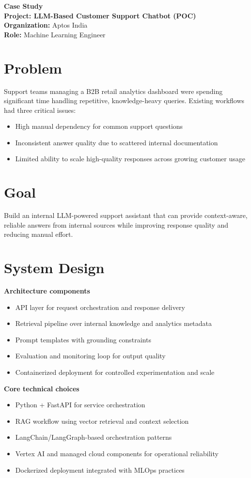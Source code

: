 \documentclass[11pt]{article}
\begin{document}
{\LARGE \textbf{Case Study}}\\
\textbf{Project: LLM-Based Customer Support Chatbot (POC)}\\
\textbf{Organization:} Aptos India\\
\textbf{Role:} Machine Learning Engineer

\section*{Problem}
Support teams managing a B2B retail analytics dashboard were spending significant time handling repetitive, knowledge-heavy queries. Existing workflows had three critical issues:
\begin{itemize}[leftmargin=1.2em]
  \item High manual dependency for common support questions
  \item Inconsistent answer quality due to scattered internal documentation
  \item Limited ability to scale high-quality responses across growing customer usage
\end{itemize}

\section*{Goal}
Build an internal LLM-powered support assistant that can provide context-aware, reliable answers from internal sources while improving response quality and reducing manual effort.

\section*{System Design}
\textbf{Architecture components}
\begin{itemize}[leftmargin=1.2em]
  \item API layer for request orchestration and response delivery
  \item Retrieval pipeline over internal knowledge and analytics metadata
  \item Prompt templates with grounding constraints
  \item Evaluation and monitoring loop for output quality
  \item Containerized deployment for controlled experimentation and scale
\end{itemize}

\textbf{Core technical choices}
\begin{itemize}[leftmargin=1.2em]
  \item Python + FastAPI for service orchestration
  \item RAG workflow using vector retrieval and context selection
  \item LangChain/LangGraph-based orchestration patterns
  \item Vertex AI and managed cloud components for operational reliability
  \item Dockerized deployment integrated with MLOps practices
\end{itemize}
\end{document}
